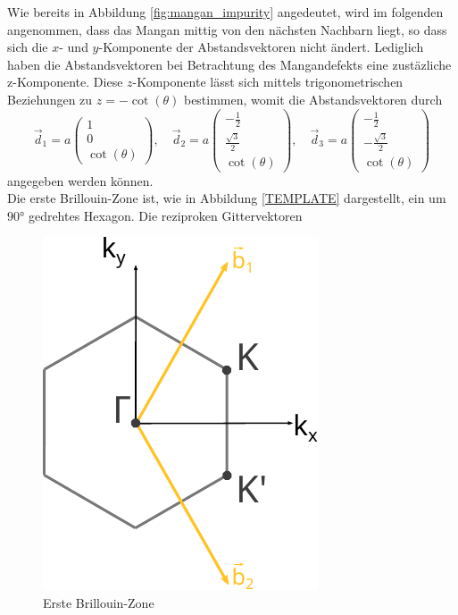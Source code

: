 Wie bereits in Abbildung \ref{fig:mangan_impurity} angedeutet, wird im folgenden angenommen, dass das Mangan mittig von den nächsten Nachbarn liegt, so dass 
sich die $x$- und $y$-Komponente der Abstandsvektoren nicht ändert.
Lediglich haben die Abstandsvektoren bei Betrachtung des Mangandefekts eine zustäzliche z-Komponente.
Diese $z$-Komponente lässt sich mittels trigonometrischen Beziehungen zu $z = -\cot (\theta)$ bestimmen, womit die 
Abstandsvektoren durch 
\begin{equation*}
    \vec{d}_1 = a \begin{pmatrix} 1            \\[4pt] 0                   \\[4pt] \cot (\theta)\end{pmatrix}, \quad
    \vec{d}_2 = a \begin{pmatrix} -\frac{1}{2} \\[4pt] \frac{\sqrt{3}}{2}  \\[4pt] \cot (\theta)\end{pmatrix}, \quad 
    \vec{d}_3 = a \begin{pmatrix} -\frac{1}{2} \\[4pt] -\frac{\sqrt{3}}{2} \\[4pt] \cot (\theta)\end{pmatrix}
\end{equation*}
angegeben werden können.\\
Die erste Brillouin-Zone ist, wie in Abbildung \ref{TEMPLATE} dargestellt, ein um $\ang{90;;}$ gedrehtes Hexagon.
Die reziproken Gittervektoren
\begin{figure}
    \centering
    \includegraphics[width = 0.3 \textwidth]{Plots/graphene_first_brillouine_zone.pdf}
    \caption{Erste Brillouin-Zone}
    \label{fig:thirstbrillouin-Zone}
\end{figure}
\FloatBarrier
